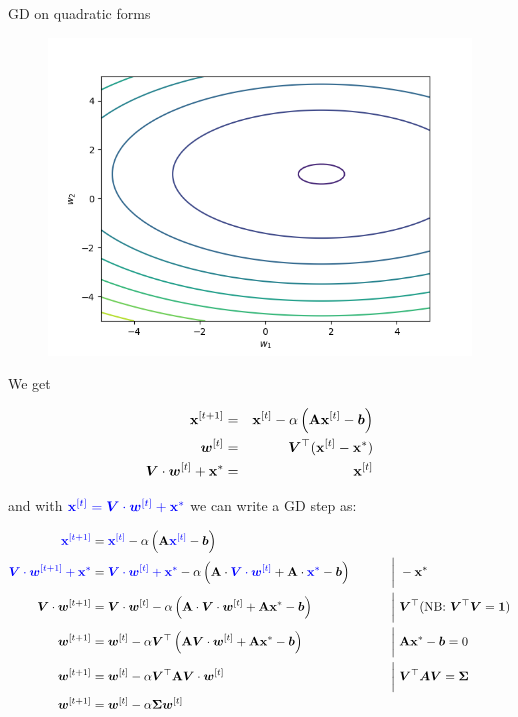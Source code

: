 \documentclass[11pt,compress,t,notes=noshow, xcolor=table]{beamer}
\begin{document}
\begin{vbframe}{GD on quadratic forms}
\begin{figure}
	\includegraphics[height=0.35\textwidth, keepaspectratio]{figure_man/gd_eigenspace.png} \\
\end{figure}

\framebreak 

We get 

\begin{eqnarray*}
    \mathbf{x}^{[t + 1]} &=& \mathbf{x}^{[t]} - \alpha \left(\mathbf{A} \mathbf{x}^{[t]} - \bm{b} \right) \\
    \bm{w}^{[ t ] } &=& \bm{V}^\top (\mathbf{x}^{[ t ] } - \mathbf{x}^\ast) \\
    \bm{V} \cdot \bm{w}^{[ t ] } + \mathbf{x}^\ast &=&  \mathbf{x}^{[ t ] } \\
\end{eqnarray*}

and with $\textcolor{blue}{\mathbf{x}^{[ t ] } = \bm{V} \cdot \bm{w}^{[ t ] } + \mathbf{x}^\ast}$ we can write a GD step as: 

\begin{footnotesize}
\begin{alignat*}{2}
    \textcolor{blue}{\mathbf{x}^{[t + 1]}} &= \textcolor{blue}{\mathbf{x}^{[t]}} - \alpha \left(\mathbf{A} \textcolor{blue}{\mathbf{x}^{[t]}} - \bm{b} \right) && \\
    \textcolor{blue}{\bm{V} \cdot \bm{w}^{[ t + 1] } + \mathbf{x}^\ast} &= \textcolor{blue}{\bm{V} \cdot \bm{w}^{[ t ] } + \mathbf{x}^\ast} - \alpha \left(\mathbf{A} \cdot \textcolor{blue}{\bm{V} \cdot \bm{w}^{[ t ] }} + \mathbf{A} \cdot \textcolor{blue}{\mathbf{x}^\ast} - \bm{b} \right) ~\qquad && \bigg|~- \mathbf{x}^\ast\\
    \bm{V} \cdot \bm{w}^{[ t + 1] } &= \bm{V} \cdot \bm{w}^{[ t ] } - \alpha \left(\mathbf{A} \cdot \bm{V} \cdot \bm{w}^{[ t ] } + \mathbf{A} \mathbf{x}^\ast - \bm{b} \right) ~\qquad && \bigg|~\bm{V}^\top (\text{NB: } \bm{V}^\top \bm{V} = \bm{1})\\
    \bm{w}^{[ t + 1] } &= \bm{w}^{[ t ] } - \alpha \bm{V}^\top\left(\mathbf{A} \bm{V} \cdot \bm{w}^{[ t ] } + \mathbf{A} \mathbf{x}^\ast - \bm{b} \right) && \bigg|~\mathbf{A} \mathbf{x}^\ast - \bm{b} = 0 \\
    \bm{w}^{[ t + 1] } &= \bm{w}^{[ t ] } - \alpha \bm{V}^\top\mathbf{A} \bm{V} \cdot \bm{w}^{[ t ] }&& \bigg|~\bm{V}^\top \bm{A} \bm{V} = \bm{\Sigma} \\
    \bm{w}^{[ t + 1] } &= \bm{w}^{[ t ] } - \alpha \bm{\Sigma} \bm{w}^{[ t ] }&& \\
\end{alignat*}
\end{footnotesize}


\end{vbframe}
\end{document}

